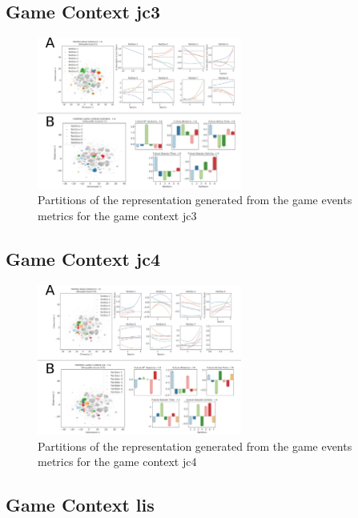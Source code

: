 \subsection{Game Context jc3}
\label{even_clust_jc3}

\begin{figure}[!htb]
\includegraphics[width=0.6\textwidth]{images/appendix_D/clust_even_jc3.png}
\centering
\caption[Partitions of the representation generated from the game events metrics for the game context jc3]{Partitions of the representation generated from the game events metrics for the game context jc3}
\end{figure}
\FloatBarrier

\subsection{Game Context jc4}
\label{even_clust_jc4}

\begin{figure}[!htb]
\includegraphics[width=0.6\textwidth]{images/appendix_D/clust_even_jc4.png}
\centering
\caption[Partitions of the representation generated from the game events metrics for the game context jc4]{Partitions of the representation generated from the game events metrics for the game context jc4}
\end{figure}
\FloatBarrier

\subsection{Game Context lis}
\label{even_clust_jc3}

